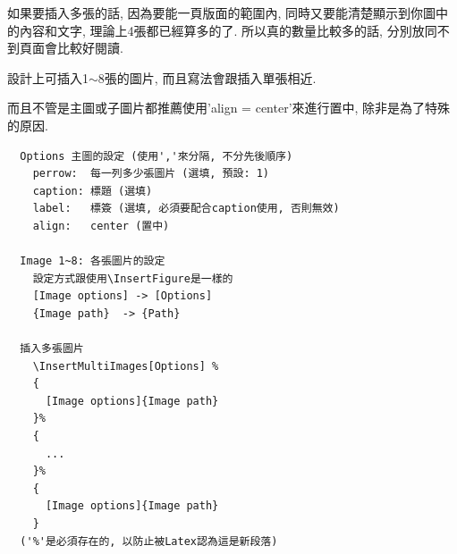 \newpage
{}

  如果要插入多張的話, 因為要能一頁版面的範圍內, 同時又要能清楚顯示到你圖中的內容和文字, 理論上4張都已經算多的了. 所以真的數量比較多的話, 分別放同不到頁面會比較好閱讀.

  設計上可插入1$\sim$8張的圖片, 而且寫法會跟插入單張相近.

  而且不管是主圖或子圖片都推薦使用'align = center'來進行置中, 除非是為了特殊的原因.

  \begin{framed}
  \begin{verbatim}
  Options 主圖的設定 (使用','來分隔, 不分先後順序)
    perrow:  每一列多少張圖片 (選填, 預設: 1)
    caption: 標題 (選填)
    label:   標簽 (選填, 必須要配合caption使用, 否則無效)
    align:   center (置中)

  Image 1~8: 各張圖片的設定
    設定方式跟使用\InsertFigure是一樣的
    [Image options] -> [Options]
    {Image path}  -> {Path}

  插入多張圖片
    \InsertMultiImages[Options] %
    {
      [Image options]{Image path}
    }%
    {
      ...
    }%
    {
      [Image options]{Image path}
    }
  ('%'是必須存在的, 以防止被Latex認為這是新段落)
  \end{verbatim}
  \end{framed}

  \newpage

